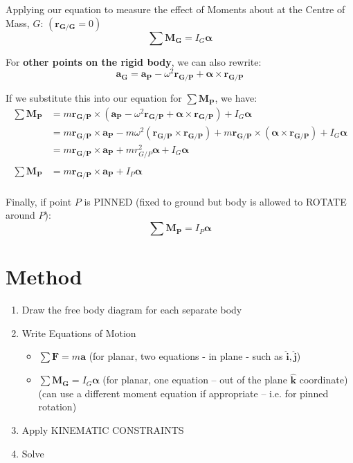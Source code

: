 \documentclass[12pt,letterpaper,twoside]{report}
\begin{document}
Applying our equation to measure the effect of Moments about at the Centre of Mass, $G$: $(\bm{r_{G/G}}=0)$
\[
\sum \bm{M_G} = I_G \bm{\alpha}
\]

For \textbf{other points on the rigid body}, we can also rewrite:
\[
\bm{a_G} = \bm{a_P} - \omega^2 \bm{r_{G/P}} + \bm{\alpha} \times \bm{r_{G/P}} 
\]

If we substitute this into our equation for $\displaystyle \sum \bm{M_P}$, we have:
\begin{align*}
\sum \bm{M_P} &= m  \bm{r_{G/P}} \times (\bm{a_P} - \omega^2 \bm{r_{G/P}} + \bm{\alpha} \times \bm{r_{G/P}} )  + I_G \bm{\alpha}\\
 &= m  \bm{r_{G/P}} \times \bm{a_P} - m  \omega^2 (\bm{r_{G/P}} \times \bm{r_{G/P}}) + m  \bm{r_{G/P}} \times (\bm{\alpha} \times \bm{r_{G/P}} )  + I_G \bm{\alpha}\\
 &= m  \bm{r_{G/P}} \times \bm{a_P} + m  r_{G/P}^2 \bm{\alpha}   + I_G \bm{\alpha}\\
 \\
\sum \bm{M_P} &= m  \bm{r_{G/P}} \times \bm{a_P}  + I_P \bm{\alpha}\\
\end{align*}

Finally, if point $P$ is PINNED (fixed to ground but body is allowed to ROTATE around $P$):
\[
\sum \bm{M_P} = I_P \bm{\alpha}
\]

\newpage

\section{Method}
\begin{enumerate}
\item Draw the free body diagram for each separate body
\item  Write Equations of Motion 
\begin{itemize}
\item $\displaystyle \sum \bm{F} = m \bm{a}$ (for planar, two equations - in plane - such as $\bm{\hat{i}}, \bm{\hat{j}}$)
\item $\displaystyle \sum \bm{M_G} = I_G \bm{\alpha}$ (for planar, one equation – out of the plane $\bm{\hat{k}}$ coordinate) \\
(can use a different moment equation if appropriate – i.e. for pinned rotation)
\end{itemize}
\item Apply KINEMATIC CONSTRAINTS
\item Solve
\end{enumerate}
\end{document}
